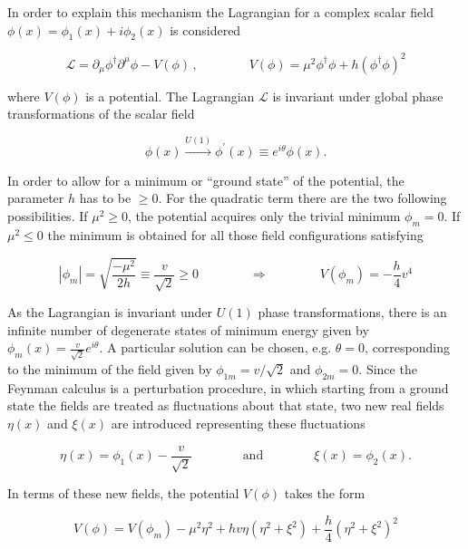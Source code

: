 In order to explain this mechanism the Lagrangian for a complex scalar field $\phi(x) = \phi_1(x) + i\phi_2(x)$ is considered

\begin{equation}\label{eqn:SM_e21}
\mathcal{L} = \partial_\mu\phi^\dag\partial^\mu\phi - V(\phi) \, , \qquad\qquad V(\phi) = \mu^2\phi^\dag\phi + h(\phi^\dag\phi)^2
\end{equation}

\noindent where $V(\phi)$ is a potential. 
The Lagrangian $\mathcal{L}$ is invariant under global phase transformations of the scalar field

\begin{equation}\label{eqn:SM_e22}
\phi(x) \xrightarrow{U(1)} \phi^\prime(x) \equiv e^{i\theta} \phi(x).
\end{equation}

In order to allow for a minimum or ``ground state'' of the potential, the parameter $h$ has to be $\geq 0$. For the quadratic term there are the two following possibilities.
If $\mu^2 \geq 0$, the potential acquires only the trivial minimum $\phi_m = 0$. If $\mu^2 \leq 0$ the minimum is obtained for all those field configurations satisfying

\begin{equation}\label{eqn:SM_e23}
|\phi_m| = \sqrt{\frac{-\mu^2}{2h}} \equiv \frac{v}{\sqrt{2}} \geq 0 \qquad\qquad \Rightarrow \qquad\qquad V(\phi_m) = -\frac{h}{4}v^4
\end{equation}

As the Lagrangian is invariant under $U(1)$ phase transformations, there is an infinite number of degenerate states of minimum energy given by 
$\phi_m(x) = \frac{v}{\sqrt{2}}e^{i\theta}$.
A particular solution can be chosen, e.g. $\theta = 0$, corresponding to the minimum of the field given by $\phi_{1m} = v/\sqrt{2}$ and $\phi_{2m} = 0$.
Since the Feynman calculus is a perturbation procedure, in which starting from a ground state the fields are treated as fluctuations about that state,
two new real fields $\eta(x)$ and $\xi(x)$ are introduced representing these fluctuations

\begin{equation}\label{eqn:SM_e24}
\eta(x) = \phi_1(x) - \frac{v}{\sqrt{2}} \qquad\qquad \mbox{and} \qquad\qquad \xi(x) = \phi_2(x).
\end{equation}

In terms of these new fields, the potential $V(\phi)$ takes the form

\begin{equation}\label{eqn:SM_e25}
V(\phi) = V(\phi_m) - \mu^2\eta^2 + hv\eta(\eta^2+\xi^2) + \frac{h}{4}(\eta^2+\xi^2)^2
\end{equation}

